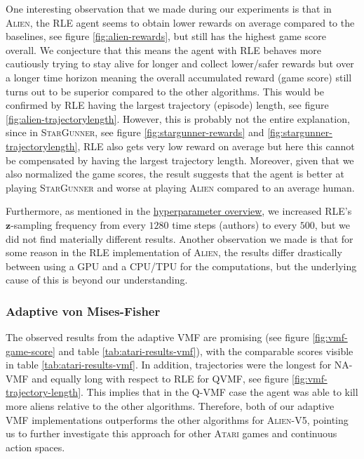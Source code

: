 \documentclass[10pt]{article} %
\begin{document}
One interesting observation that we made during our experiments is that in \textsc{Alien}, the \textsc{RLE} agent seems to obtain lower rewards on average compared to the baselines, see figure \ref{fig:alien-rewards}, but still has the highest game score overall. We conjecture that this means the agent with \textsc{RLE} behaves more cautiously trying to stay alive for longer and collect lower/safer rewards but over a longer time horizon meaning the overall accumulated reward (game score) still turns out to be superior compared to the other algorithms. This would be confirmed by \textsc{RLE} having the largest trajectory (episode) length, see figure \ref{fig:alien-trajectorylength}. However, this is probably not the entire explanation, since in \textsc{StarGunner}, see figure \ref{fig:stargunner-rewards} and \ref{fig:stargunner-trajectorylength}, \textsc{RLE} also gets very low reward on average but here this cannot be compensated by having the largest trajectory length. Moreover, given that we also normalized the game scores, the result suggests that the agent is better at playing \textsc{StarGunner} and worse at playing \textsc{Alien} compared to an average human.

\noindent Furthermore, as mentioned in the \hyperlink{hyperparameter-subsection}{hyperparameter overview}, we increased \textsc{RLE}'s $\textbf{z}$-sampling frequency from every $1280$ time steps (authors) to every $500$, but we did not find materially different results. Another observation we made is that for some reason in the \textsc{RLE} implementation of \textsc{Alien}, the results differ drastically between using a GPU and a CPU/TPU for the computations, but the underlying cause of this is beyond our understanding.

\subsubsection{Adaptive von Mises-Fisher}
The observed results from the adaptive VMF are promising (see figure \ref{fig:vmf-game-score} and table \ref{tab:atari-results-vmf}), with the comparable scores visible in table \ref{tab:atari-results-vmf}. In addition, trajectories were the longest for NA-VMF and equally long with respect to \textsc{RLE} for QVMF, see figure \ref{fig:vmf-trajectory-length}. This implies that in the Q-VMF case the agent was able to kill more aliens relative to the other algorithms. Therefore, both of our adaptive VMF implementations outperforms the other algorithms for \textsc{Alien-V5}, pointing us to further investigate this approach for other \textsc{Atari} games and continuous action spaces.  
\end{document}
